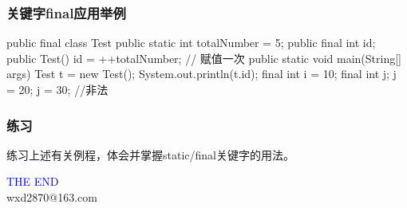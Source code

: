 \documentclass[hyperref={pdfpagelabels=false},compress,table]{beamer} %
\begin{document}
\begin{frame}[fragile] %
\frametitle{关键字final应用举例}
\begin{javaCode}
public final class Test {
  public static int totalNumber = 5;
  public final int id;
  public Test() {
    id = ++totalNumber; // 赋值一次
  }
  public static void main(String[] args) {
    Test t = new Test();
    System.out.println(t.id);
    final int i = 10;
    final int j;
    j = 20;
    j = 30;  //非法
  }
}
\end{javaCode}
\end{frame}

\begin{frame}[fragile] %
\frametitle{练习}
练习上述有关例程，体会并掌握static/final关键字的用法。
\end{frame}

% 
% 

\begin{frame}
\centering
{\Huge \textcolor{blue}{THE END}} \\
\vspace{5mm}
{\Large wxd2870@163.com} \\
\end{frame}
\end{document}
